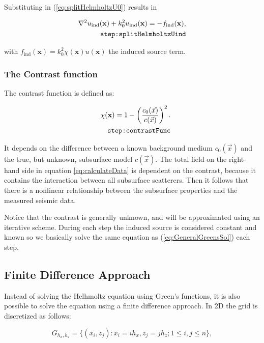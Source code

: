 \documentclass[10pt,a4paper]{article}
\begin{document}
Substituting in (\ref{eq:splitHelmholtzU0}) results in

\begin{align} \label{eq:splitHelmholtzUind}
\nabla^2 u_\text{ind}(\mathbf{x}) + k_0^2 u_\text{ind}(\mathbf{x}) =
-f_\text{ind}(\mathbf{x}),\\
\tag*{\texttt{step:splitHelmholtzUind}}
\end{align}

with $f_\text{ind}(\mathbf{x}) = k_0^2 \chi(\mathbf{x}) u(\mathbf{x})$
the induced source term.

\subsubsection{The Contrast function}
The contrast function is defined as:

\begin{align} \label{eq:contrastFunc}\chi(\mathbf{x}) = 1 -
\left(\frac{c_0(\vec{x})}{c(\vec{x})} \right)^2.\\
\tag*{\texttt{step:contrastFunc}}
\end{align}

It depends on the difference between a known background medium
$c_\text{0}(\vec{x})$ and the true, but unknown, subsurface model
$c(\vec{x})$. The total field on the right-hand side in equation
\ref{eq:calculateData} is dependent on the contrast, because it contains the
interaction between all subsurface scatterers. Then it follows that
there is a nonlinear relationship between the subsurface properties
and the measured seismic data.

Notice that the contrast is generally unknown, and will be
approximated using an iterative scheme. During each step the induced
source is considered constant and known so we basically solve the same
equation as (\ref{eq:GeneralGreensSol}) each step.

\subsection{Finite Difference Approach}
Instead of solving the Helhmoltz equation using Green's functions, it is also possible to solve the equation using a finite difference approach. In 2D the grid is discretized as follows:

\begin{equation}
G_{h_x,h_z} = \{(x_i,z_j): x_i = ih_x, z_j=jh_z; 1\leq i,j\leq n\},
\end{equation} 
\end{document}
